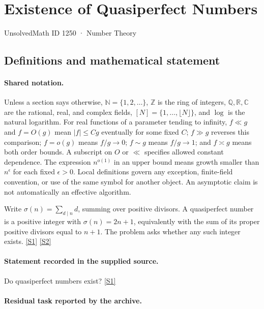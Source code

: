 \documentclass[11pt,a4paper]{article}
\newcommand{\N}{\mathbb{N}}
\newcommand{\Z}{\mathbb{Z}}
\newcommand{\Q}{\mathbb{Q}}
\newcommand{\R}{\mathbb{R}}
\newcommand{\C}{\mathbb{C}}
\newcommand{\sref}[2]{\hyperlink{source:#1:#2}{[S#2]}}
\begin{document}

\setcounter{section}{1249}

\section{Existence of Quasiperfect Numbers}\label{1250}

{\small\sffamily UnsolvedMath ID 1250 · Number Theory}

\subsection{Definitions and mathematical statement}

\paragraph{Shared notation.}Unless a section says otherwise, $\N=\{1,2,\ldots\}$,
$\Z$ is the ring of integers, $\Q,\R,\C$ are the rational, real, and complex
fields, $[N]=\{1,\ldots,\lfloor N\rfloor\}$, and $\log$ is the natural
logarithm. For real functions of a parameter tending to infinity,
$f\ll g$ and $f=O(g)$ mean $|f|\leq Cg$ eventually for some fixed $C$;
$f\gg g$ reverses this comparison; $f=o(g)$ means $f/g\to0$;
$f\sim g$ means $f/g\to1$; and $f\asymp g$ means both order bounds.
A subscript on $O$ or $\ll$ specifies allowed constant dependence.
The expression $n^{o(1)}$ in an upper bound means growth smaller than
$n^\epsilon$ for each fixed $\epsilon>0$. Local definitions govern any
exception, finite-field convention, or use of the same symbol for another
object. An asymptotic claim is not automatically an effective algorithm.



Write $\sigma(n)=\sum_{d\mid n}d$, summing over positive divisors. A quasiperfect number is a positive integer with $\sigma(n)=2n+1$, equivalently with the sum of its proper positive divisors equal to $n+1$. The problem asks whether any such integer exists. \sref{1250}{1} \sref{1250}{2}

\paragraph{Statement recorded in the supplied source.}
Do quasiperfect numbers exist? \sref{1250}{1}

\paragraph{Residual task reported by the archive.}
\end{document}
